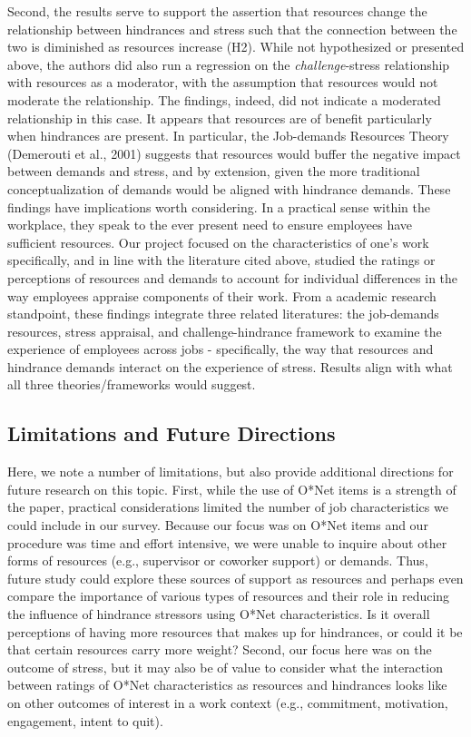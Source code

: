 \documentclass[
  man]{apa6}
\begin{document}
Second, the results serve to support the assertion that resources change the relationship between hindrances and stress such that the connection between the two is diminished as resources increase (H2). While not hypothesized or presented above, the authors did also run a regression on the \emph{challenge}-stress relationship with resources as a moderator, with the assumption that resources would not moderate the relationship. The findings, indeed, did not indicate a moderated relationship in this case. It appears that resources are of benefit particularly when hindrances are present. In particular, the Job-demands Resources Theory (Demerouti et al., 2001) suggests that resources would buffer the negative impact between demands and stress, and by extension, given the more traditional conceptualization of demands would be aligned with hindrance demands.
These findings have implications worth considering. In a practical sense within the workplace, they speak to the ever present need to ensure employees have sufficient resources. Our project focused on the characteristics of one's work specifically, and in line with the literature cited above, studied the ratings or perceptions of resources and demands to account for individual differences in the way employees appraise components of their work. From a academic research standpoint, these findings integrate three related literatures: the job-demands resources, stress appraisal, and challenge-hindrance framework to examine the experience of employees across jobs - specifically, the way that resources and hindrance demands interact on the experience of stress. Results align with what all three theories/frameworks would suggest.

\hypertarget{limitations-and-future-directions}{%
\subsection{Limitations and Future Directions}\label{limitations-and-future-directions}}

Here, we note a number of limitations, but also provide additional directions for future research on this topic. First, while the use of O*Net items is a strength of the paper, practical considerations limited the number of job characteristics we could include in our survey. Because our focus was on O*Net items and our procedure was time and effort intensive, we were unable to inquire about other forms of resources (e.g., supervisor or coworker support) or demands. Thus, future study could explore these sources of support as resources and perhaps even compare the importance of various types of resources and their role in reducing the influence of hindrance stressors using O*Net characteristics. Is it overall perceptions of having more resources that makes up for hindrances, or could it be that certain resources carry more weight? Second, our focus here was on the outcome of stress, but it may also be of value to consider what the interaction between ratings of O*Net characteristics as resources and hindrances looks like on other outcomes of interest in a work context (e.g., commitment, motivation, engagement, intent to quit).
\end{document}
